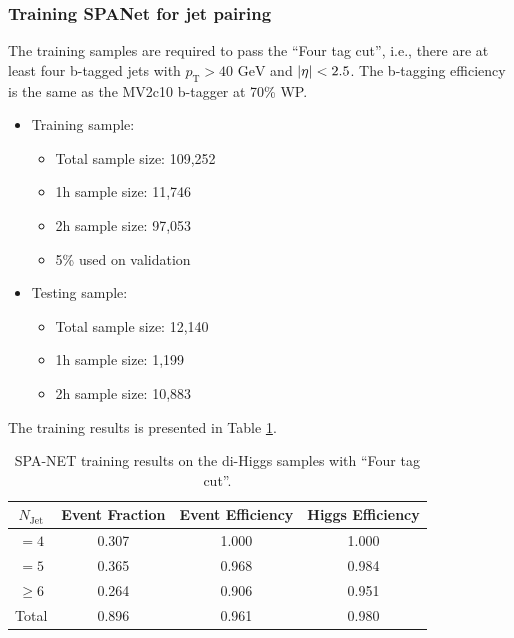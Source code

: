 \documentclass[12pt]{article}
\begin{document}
		\subsubsection{Training SPANet for jet pairing}%
		\label{subs:training_spanet_for_jet_pairing}
			The training samples are required to pass the ``Four tag cut'', i.e., there are at least four b-tagged jets with $p_{\text{T}} > \text{40 GeV}$ and $\abs{\eta} < 2.5$. The b-tagging efficiency is the same as the MV2c10 b-tagger at 70\% WP.
			\begin{itemize}
				\item Training sample:
				\begin{itemize}
					\item Total sample size: 109,252
					\item 1h sample size: 11,746
					\item 2h sample size: 97,053
					\item 5\% used on validation
				\end{itemize}
				\item Testing sample: 
				\begin{itemize}
					\item Total sample size: 12,140
					\item 1h sample size: 1,199
					\item 2h sample size: 10,883
				\end{itemize}
			\end{itemize}
			The training results is presented in Table \ref{tab:SPANet_diHiggs_4btag_MV2c10_pt40}.
			\begin{table}[htpb]
				\centering
				\caption{SPA-NET training results on the di-Higgs samples with ``Four tag cut''.}
				\label{tab:SPANet_diHiggs_4btag_MV2c10_pt40}
				\begin{tabular}{c|c|cc}
					$N_\text{Jet}$ & Event Fraction & Event Efficiency & Higgs Efficiency \\
					\hline
					$=4$	  &   0.307             &    1.000              &    1.000             \\
					$=5$	  &   0.365             &    0.968              &    0.984             \\
					$\ge 6$	  &   0.264             &    0.906              &    0.951             \\
					Total	  &   0.896             &    0.961              &    0.980             \\
				\end{tabular}
			\end{table}
	
\end{document}
